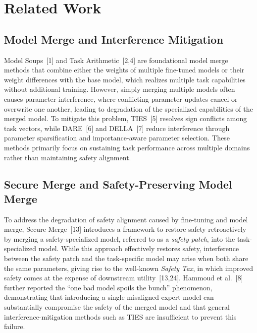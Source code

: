 \documentclass{article}
\begin{document}
    

\section{Related Work}

\subsection{Model Merge and Interference Mitigation}

Model Soups~[1] and Task Arithmetic~[2,4] are foundational model merge methods that combine either the weights of multiple fine-tuned models or their weight differences with the base model, which realizes multiple task capabilities without additional training. However, simply merging multiple models often causes parameter interference, where conflicting parameter updates cancel or overwrite one another, leading to degradation of the specialized capabilities of the merged model. To mitigate this problem, TIES~[5] resolves sign conflicts among task vectors, while DARE~[6] and DELLA~[7] reduce interference through parameter sparsification and importance-aware parameter selection. These methods primarily focus on sustaining task performance across multiple domains rather than maintaining safety alignment.

\subsection{Secure Merge and Safety-Preserving Model Merge}

To address the degradation of safety alignment caused by fine-tuning and model merge, Secure Merge~[13] introduces a framework to restore safety retroactively by merging a safety-specialized model, referred to as a \emph{safety patch}, into the task-specialized model. While this approach effectively restores safety, interference between the safety patch and the task-specific model may arise when both share the same parameters, giving rise to the well-known \emph{Safety Tax}, in which improved safety comes at the expense of downstream utility~[13,24]. Hammoud et al.~[8] further reported the ``one bad model spoils the bunch'' phenomenon, demonstrating that introducing a single misaligned expert model can substantially compromise the safety of the merged model and that general interference-mitigation methods such as TIES are insufficient to prevent this failure.
\end{document}
